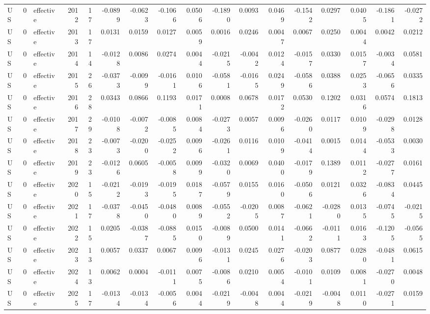 \begin{tabular}{lrlrrrrrrrrrrrrrr}
US & 0 & effective & 2012 & 17 & -0.0899 & -0.0623 & -0.1066 & 0.0506 & -0.1890 & 0.0093 & 0.0469 & -0.1542 & 0.0297 & 0.0405 & -0.1861 & -0.0272 \\
US & 0 & effective & 2013 & 17 & 0.0131 & 0.0159 & 0.0127 & 0.0059 & 0.0016 & 0.0246 & 0.0047 & 0.0067 & 0.0250 & 0.0044 & 0.0042 & 0.0212 \\
US & 0 & effective & 2014 & 14 & -0.0128 & 0.0086 & 0.0274 & 0.0044 & -0.0215 & -0.0042 & 0.0124 & -0.0157 & 0.0330 & 0.0157 & -0.0034 & 0.0581 \\
US & 0 & effective & 2015 & 26 & -0.0373 & -0.0099 & -0.0161 & 0.0106 & -0.0581 & -0.0165 & 0.0249 & -0.0586 & 0.0388 & 0.0253 & -0.0656 & 0.0335 \\
US & 0 & effective & 2016 & 28 & 0.0343 & 0.0866 & 0.1193 & 0.0171 & 0.0008 & 0.0678 & 0.0172 & 0.0530 & 0.1202 & 0.0316 & 0.0574 & 0.1813 \\
US & 0 & effective & 2017 & 29 & -0.0108 & -0.0072 & -0.0085 & 0.0084 & -0.0273 & 0.0057 & 0.0096 & -0.0260 & 0.0117 & 0.0109 & -0.0298 & 0.0128 \\
US & 0 & effective & 2018 & 23 & -0.0073 & -0.0200 & -0.0252 & 0.0096 & -0.0261 & 0.0116 & 0.0109 & -0.0414 & 0.0015 & 0.0144 & -0.0533 & 0.0030 \\
US & 0 & effective & 2019 & 23 & -0.0126 & 0.0605 & -0.0058 & 0.0099 & -0.0320 & 0.0069 & 0.0400 & -0.0179 & 0.1389 & 0.0112 & -0.0277 & 0.0161 \\
US & 0 & effective & 2020 & 15 & -0.0212 & -0.0193 & -0.0195 & 0.0187 & -0.0579 & 0.0155 & 0.0160 & -0.0506 & 0.0121 & 0.0326 & -0.0834 & 0.0445 \\
US & 0 & effective & 2021 & 17 & -0.0378 & -0.0450 & -0.0480 & 0.0089 & -0.0552 & -0.0205 & 0.0087 & -0.0621 & -0.0280 & 0.0135 & -0.0745 & -0.0215 \\
US & 0 & effective & 2022 & 15 & 0.0205 & -0.0387 & -0.0885 & 0.0150 & -0.0089 & 0.0500 & 0.0141 & -0.0662 & -0.0111 & 0.0163 & -0.1205 & -0.0565 \\
US & 0 & effective & 2023 & 13 & 0.0057 & 0.0337 & 0.0067 & 0.0096 & -0.0131 & 0.0245 & 0.0276 & -0.0203 & 0.0877 & 0.0280 & -0.0481 & 0.0615 \\
US & 0 & effective & 2024 & 13 & 0.0062 & 0.0004 & -0.0111 & 0.0075 & -0.0086 & 0.0210 & 0.0054 & -0.0101 & 0.0109 & 0.0081 & -0.0270 & 0.0048 \\
US & 0 & effective & 2025 & 17 & -0.0134 & -0.0134 & -0.0056 & 0.0044 & -0.0219 & -0.0048 & 0.0044 & -0.0219 & -0.0048 & 0.0110 & -0.0271 & 0.0159 \\

\end{tabular}
